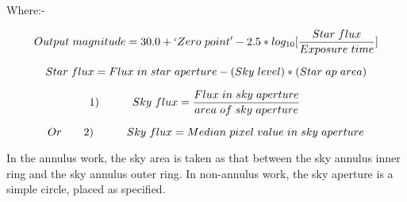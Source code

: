 {{                                                                               
   Where:-
                                                                               
   $$ Output{\hspace{0.3em}}magnitude = 30.0 + `Zero{\hspace{0.3em}}point' - 2.5*log_{10}[\frac{Star{\hspace{0.3em}}flux}{Exposure{\hspace{0.3em}}time}] $$
                                                                               
$$   Star{\hspace{0.3em}}flux = Flux{\hspace{0.3em}}in{\hspace{0.3em}}star{\hspace{0.3em}}aperture -               (Sky{\hspace{0.3em}}level)*(Star{\hspace{0.3em}}ap{\hspace{0.3em}}area) $$

$$ {\hspace*{-2em}}     1) {\hspace*{3em}}   Sky{\hspace{0.3em}}flux  = \frac{Flux{\hspace{0.3em}}in{\hspace{0.3em}}sky{\hspace{0.3em}}aperture}{area{\hspace{0.3em}}of{\hspace{0.3em}}sky{\hspace{0.3em}}aperture} $$

$$   Or {\hspace*{2em}}   2) {\hspace*{3em}} Sky{\hspace{0.3em}}flux  = Median{\hspace{0.3em}}pixel{\hspace{0.3em}}value{\hspace{0.3em}}in{\hspace{0.3em}}sky{\hspace{0.3em}}aperture  $$
                                                                               
   In the annulus work, the sky area is taken as that between the
   sky annulus inner ring and the sky annulus outer ring.
   In non-annulus work, the sky aperture is a simple circle, placed
   as specified.
                                                                               
}}
